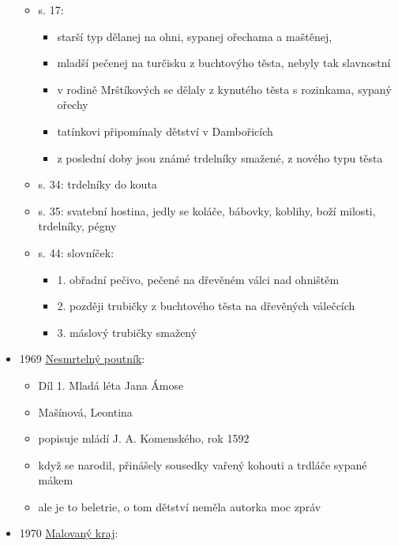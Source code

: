 \begin{itemize}
  \begin{itemize}
  \tightlist
  \item
    s. 17:

    \begin{itemize}
    \tightlist
    \item
      starší typ dělanej na ohni, sypanej ořechama a maštěnej,
    \item
      mladší pečenej na turčisku z buchtovýho těsta, nebyly tak
      slavnostní
    \item
      v rodině Mrštíkových se dělaly z kynutého těsta s rozinkama,
      sypaný ořechy
    \item
      tatínkovi připomínaly dětství v Dambořicích
    \item
      z poslední doby jsou známé trdelníky smažené, z nového typu těsta
    \end{itemize}
  \item
    s. 34: trdelníky do kouta
  \item
    s. 35: svatební hostina, jedly se koláče, bábovky, koblihy, boží
    milosti, trdelníky, pégny
  \item
    s. 44: slovníček:

    \begin{itemize}
    \tightlist
    \item
      1. obřadní pečivo, pečené na dřevěném válci nad ohništěm
    \item
      2. později trubičky z buchtového těsta na dřevěných válečcích
    \item
      3. máslový trubičky smažený
    \end{itemize}
  \end{itemize}
\item
  1969
  \href{https://ceskadigitalniknihovna.cz/uuid/uuid:be0ae270-94a1-11e8-9690-005056827e51}{Nesmrtelný
  poutník}:

  \begin{itemize}
  \tightlist
  \item
    Díl 1. Mladá léta Jana Ámose
  \item
    Mašínová, Leontina
  \item
    popisuje mládí J. A. Komenského, rok 1592
  \item
    když se narodil, přinášely sousedky vařený kohouti a trdláče sypané
    mákem
  \item
    ale je to beletrie, o tom dětství neměla autorka moc zpráv
  \end{itemize}
\item
  1970
  \href{https://ceskadigitalniknihovna.cz/uuid/uuid:874ae8f0-f920-11e3-b4ad-005056827e51}{Malovaný
  kraj}:


\end{itemize}
